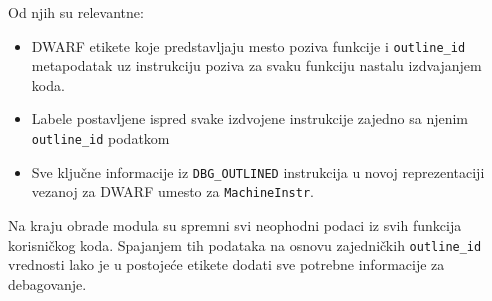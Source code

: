 \documentclass[12pt,oneside]{memoir}
\begin{document}
Od njih su relevantne:
\begin{itemize}
  \item DWARF etikete koje predstavljaju mesto poziva funkcije i \verb|outline_id| metapodatak uz instrukciju poziva za svaku funkciju nastalu izdvajanjem koda.
  \item Labele postavljene ispred svake izdvojene instrukcije zajedno sa njenim \verb|outline_id| podatkom
  \item Sve ključne informacije iz \verb|DBG_OUTLINED| instrukcija u novoj reprezentaciji vezanoj za DWARF umesto za \verb|MachineInstr|.
\end{itemize}
Na kraju obrade modula su spremni svi neophodni podaci iz svih funkcija korisničkog koda.
Spajanjem tih podataka na osnovu zajedničkih \verb|outline_id| vrednosti lako je u postojeće etikete dodati sve potrebne informacije za debagovanje.

\end{document}
